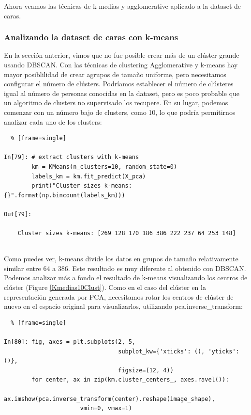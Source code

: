 Ahora veamos las técnicas de k-medias y  agglomerative  aplicado a la dataset de caras.




\subsubsection{Analizando la dataset de caras con k-means}


 En la sección anterior, vimos que no fue posible crear más de un  clúster grande usando DBSCAN.  Con las técnicas de   clustering Agglomerative  y   k-means  hay mayor posiblilidad de  crear agrupos de tamaño uniforme, pero necesitamos configurar el número  de clústers. Podríamos establecer el número de clústeres igual al número  de personas conocidas en la dataset, pero es poco probable que un algoritmo de clusters no supervisado los recupere. En su lugar, podemos comenzar con un número bajo de clusters, como 10, lo que podría permitirnos analizar cada uno de los clusters:\\


\begin{lstlisting}  % [frame=single]	

In[79]: # extract clusters with k-means
        km = KMeans(n_clusters=10, random_state=0)
        labels_km = km.fit_predict(X_pca)
        print("Cluster sizes k-means: {}".format(np.bincount(labels_km)))

Out[79]:

    Cluster sizes k-means: [269 128 170 186 386 222 237 64 253 148]


\end{lstlisting} 



Como puedes ver, k-means divide los datos en grupos de tamaño relativamente similar entre 64 a 386. Este resultado es muy diferente al obtenido con  DBSCAN.\\

 Podemos analizar más a fondo el resultado de k-means visualizando los centros de clúster (Figure \ref{Kmedias10Clust}). Como en el caso del clúster en la representación generada por PCA, necesitamos rotar los centros de clúster de nuevo en el espacio original para visualizarlos, utilizando {\ttfamily pca.inverse\_transform}:\\

\begin{lstlisting}  % [frame=single]

In[80]: fig, axes = plt.subplots(2, 5, 
                                 subplot_kw={'xticks': (), 'yticks': ()},
                                 figsize=(12, 4))
        for center, ax in zip(km.cluster_centers_, axes.ravel()):
            ax.imshow(pca.inverse_transform(center).reshape(image_shape),
                      vmin=0, vmax=1)


\end{lstlisting} 


